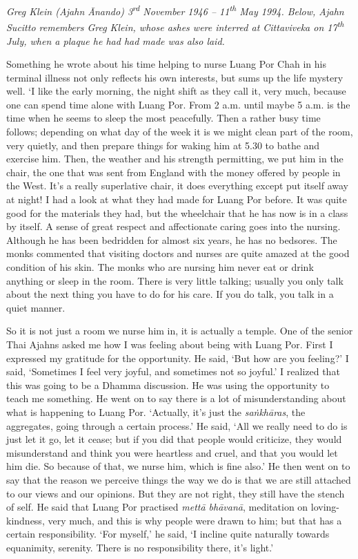 
\emph{Greg Klein (Ajahn Ānando) 3\textsuperscript{rd} November 1946 --
11\textsuperscript{th} May 1994.  Below, Ajahn Sucitto remembers Greg
Klein, whose ashes were interred at Cittaviveka on
17\textsuperscript{th} July, when a plaque he had had made was also
laid.}

Something he wrote about his time helping to nurse Luang Por Chah in his
terminal illness not only reflects his own interests, but sums up the
life mystery well. `I like the early morning, the night shift as they
call it, very much, because one can spend time alone with Luang Por. 
From 2 a.m. until maybe 5 a.m. is the time when he seems to sleep the
most peacefully. Then a rather busy time follows; depending on what day
of the week it is we might clean part of the room, very quietly, and
then prepare things for waking him at 5.30 to bathe and exercise him. 
Then, the weather and his strength permitting, we put him in the chair, 
the one that was sent from England with the money offered by people in
the West. It's a really superlative chair, it does everything except put
itself away at night! I had a look at what they had made for Luang Por
before. It was quite good for the materials they had, but the wheelchair
that he has now is in a class by itself. A sense of great respect and
affectionate caring goes into the nursing. Although he has been
bedridden for almost six years, he has no bedsores. The monks commented
that visiting doctors and nurses are quite amazed at the good condition
of his skin. The monks who are nursing him never eat or drink anything
or sleep in the room. There is very little talking; usually you only
talk about the next thing you have to do for his care. If you do talk, 
you talk in a quiet manner.

So it is not just a room we nurse him in, it is actually a temple. One
of the senior Thai Ajahns asked me how I was feeling about being with
Luang Por. First I expressed my gratitude for the opportunity. He said, 
`But how are you feeling?' I said, `Sometimes I feel very joyful, and
sometimes not so joyful.' I realized that this was going to be a Dhamma
discussion. He was using the opportunity to teach me something. He went
on to say there is a lot of misunderstanding about what is happening to
Luang Por. `Actually, it's just the \emph{saṅkhāras}, the aggregates, going
through a certain process.' He said, `All we really need to do is just
let it go, let it cease; but if you did that people would criticize, 
they would misunderstand and think you were heartless and cruel, and
that you would let him die. So because of that, we nurse him, which is
fine also.' He then went on to say that the reason we perceive things
the way we do is that we are still attached to our views and our
opinions. But they are not right, they still have the stench of self. He
said that Luang Por practised \emph{mettā bhāvanā}, meditation on
loving-kindness, very much, and this is why people were drawn to him; 
but that has a certain responsibility. `For myself,' he said, `I incline
quite naturally towards equanimity, serenity. There is no responsibility
there, it's light.'

